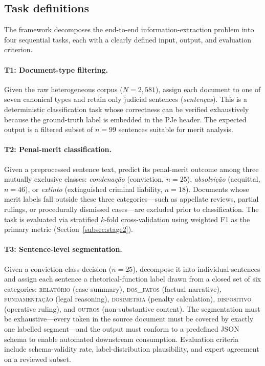 \documentclass[preprint,a4paper,fleqn]{cas-dc}
\begin{document}
\subsection{Task definitions}
\label{subsec:tasks}

The framework decomposes the end-to-end information-extraction problem into four sequential tasks, each with a clearly defined input, output, and evaluation criterion.

\paragraph{T1: Document-type filtering.}
Given the raw heterogeneous corpus ($N=2{,}581$), assign each document to one of seven canonical types and retain only judicial sentences (\textit{senten\c{c}as}). This is a deterministic classification task whose correctness can be verified exhaustively because the ground-truth label is embedded in the PJe header. The expected output is a filtered subset of $n=99$ sentences suitable for merit analysis.

\paragraph{T2: Penal-merit classification.}
Given a preprocessed sentence text, predict its penal-merit outcome among three mutually exclusive classes: \textit{condena\c{c}\~ao} (conviction, $n=25$), \textit{absolvi\c{c}\~ao} (acquittal, $n=46$), or \textit{extinto} (extinguished criminal liability, $n=18$). Documents whose merit labels fall outside these three categories---such as appellate reviews, partial rulings, or procedurally dismissed cases---are excluded prior to classification. The task is evaluated via stratified $k$-fold cross-validation using weighted F1 as the primary metric (Section~\ref{subsec:stage2}).

\paragraph{T3: Sentence-level segmentation.}
Given a conviction-class decision ($n=25$), decompose it into individual sentences and assign each sentence a rhetorical-function label drawn from a closed set of six categories: \textsc{relat\'orio} (case summary), \textsc{dos\_fatos} (factual narrative), \textsc{fundamenta\c{c}\~ao} (legal reasoning), \textsc{dosimetria} (penalty calculation), \textsc{dispositivo} (operative ruling), and \textsc{outros} (non-substantive content). The segmentation must be exhaustive---every token in the source document must be covered by exactly one labelled segment---and the output must conform to a predefined JSON schema to enable automated downstream consumption. Evaluation criteria include schema-validity rate, label-distribution plausibility, and expert agreement on a reviewed subset.
\end{document}
